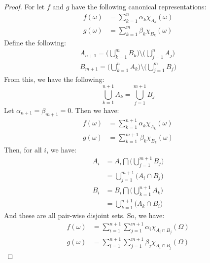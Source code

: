     \begin{proof}
        For let $f$ and $g$ have the following
        canonical representations:
        \begin{align}
            f(\omega)&=\sum_{k=1}^{n}\alpha_{k}
                \chi_{A_{k}}(\omega)\\
            g(\omega)&=\sum_{k=1}^{m}\beta_{k}
                \chi_{B_{k}}(\omega)
        \end{align}
        Define the following:
        \begin{align}
            A_{n+1}
            =\Big(\bigcup_{k=1}^{m}B_{k}\Big)\setminus
                \Big(\bigcup_{j=1}^{n}A_{j}\Big)\\
            B_{m+1}
            =\Big(\bigcup_{k=1}^{n}A_{k}\Big)\setminus
                \Big(\bigcup_{j=1}^{m}B_{j}\Big)
        \end{align}
        From this, we have the following:
        \begin{equation}
            \bigcup_{k=1}^{n+1}A_{k}=
            \bigcup_{j=1}^{m+1}B_{j}
        \end{equation}
        Let $\alpha_{n+1}=\beta_{m+1}=0$. Then we have:
        \begin{align}
            f(\omega)&=\sum_{k=1}^{n+1}\alpha_{k}
                \chi_{A_{k}}(\omega)\\
            g(\omega)&=\sum_{k=1}^{m+1}\beta_{k}
                \chi_{B_{k}}(\omega)
        \end{align}
        Then, for all $i$, we have:
        \begin{align}
            A_{i}&=A_{i}\bigcap
                \Big(\bigcup_{j=1}^{m+1}B_{j}\Big)\\
            &=\bigcup_{j=1}^{m+1}
                \Big(A_{i}\cap{B}_{j}\Big)\\
            B_{i}&=B_{i}\bigcap
                \Big(\bigcup_{k=1}^{n+1}A_{k}\Big)\\
            &=\bigcup_{k=1}^{n+1}
                \Big(A_{k}\cap{B}_{i}\Big)
        \end{align}
        And these are all pair-wise disjoint sets.
        So, we have:
        \begin{align}
            f(\omega)&=
            \sum_{i=1}^{n+1}\sum_{j=1}^{m+1}\alpha_{i}
                \chi_{A_{i}\cap{B}_{j}}(\Omega)\\
            g(\omega)&=
            \sum_{i=1}^{n+1}\sum_{j=1}^{m+1}\beta_{j}
                \chi_{A_{i}\cap{B}_{j}}(\Omega)
        \end{align}

\end{proof}
